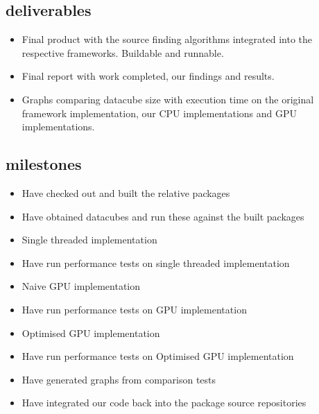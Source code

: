 \documentclass[prodmode,acmtecs]{acmsmall} \usepackage[ruled]{algorithm2e}
\begin{document}
\subsection{deliverables}
\begin{itemize}
\item  Final product with the source finding algorithms integrated into the respective frameworks. Buildable and runnable.
\item  Final report with work completed, our findings and results.
\item  Graphs comparing datacube size with execution time on the original framework implementation, our CPU implementations and GPU implementations.
\end{itemize}

\subsection{milestones}
\begin{itemize}
\item  Have checked out and built the relative packages
\item  Have obtained datacubes and run these against the built packages
\item  Single threaded implementation
\item  Have run performance tests on single threaded implementation
\item  Naive GPU implementation
\item  Have run performance tests on GPU implementation
\item  Optimised GPU implementation
\item  Have run performance tests on Optimised GPU implementation
\item  Have generated graphs from comparison tests
\item  Have integrated our code back into the package source repositories
\end{itemize}



\end{document}
